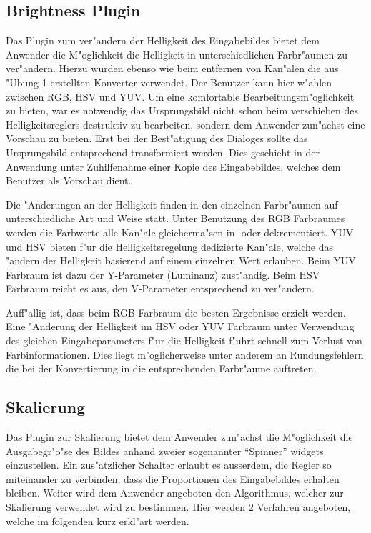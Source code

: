 \documentclass[a4paper]{article}
\begin{document}
\subsection{Brightness Plugin}
Das Plugin zum ver"andern der Helligkeit des Eingabebildes bietet dem Anwender die M"oglichkeit die Helligkeit in unterschiedlichen Farbr"aumen zu ver"andern. Hierzu wurden ebenso wie beim entfernen von Kan"alen die aus "Ubung 1 erstellten Konverter verwendet. Der Benutzer kann hier w"ahlen zwischen RGB, HSV und YUV.
Um eine komfortable Bearbeitungsm"oglichkeit zu bieten, war es notwendig das Ursprungsbild nicht schon beim verschieben des Helligkeitsreglers destruktiv zu bearbeiten, sondern dem Anwender zun"achst eine Vorschau zu bieten. Erst bei der Best"atigung des Dialoges sollte das Ursprungsbild entsprechend transformiert werden. Dies geschieht in der Anwendung unter Zuhilfenahme einer Kopie des Eingabebildes, welches dem Benutzer als Vorschau dient.

Die "Anderungen an der Helligkeit finden in den einzelnen Farbr"aumen auf unterschiedliche Art und Weise statt. Unter Benutzung des RGB Farbraumes werden die Farbwerte alle Kan"ale gleicherma"sen in- oder dekrementiert. YUV und HSV bieten f"ur die Helligkeitsregelung dedizierte Kan"ale, welche das "andern der Helligkeit basierend auf einem einzelnen Wert erlauben. Beim YUV Farbraum ist dazu der Y-Parameter (Luminanz) zust"andig. Beim HSV Farbraum reicht es aus, den V-Parameter entsprechend zu ver"andern. 

Auff"allig ist, dass beim RGB Farbraum die besten Ergebnisse erzielt werden. Eine "Anderung der Helligkeit im HSV oder YUV Farbraum unter Verwendung des gleichen Eingabeparameters f"ur die Helligkeit f"uhrt schnell zum Verlust von Farbinformationen. Dies liegt m"oglicherweise unter anderem an Rundungsfehlern die bei der Konvertierung in die entsprechenden Farbr"aume auftreten.


\subsection{Skalierung}
Das Plugin zur Skalierung bietet dem Anwender zun"achst die M"oglichkeit die Ausgabegr"o"se des Bildes anhand zweier sogenannter ``Spinner'' widgets einzustellen. Ein zus"atzlicher Schalter erlaubt es ausserdem, die Regler so miteinander zu verbinden, dass die Proportionen des Eingabebildes erhalten bleiben. Weiter wird dem Anwender angeboten den Algorithmus, welcher zur Skalierung verwendet wird zu bestimmen. Hier werden 2 Verfahren angeboten, welche im folgenden kurz erkl"art werden.
\end{document}
